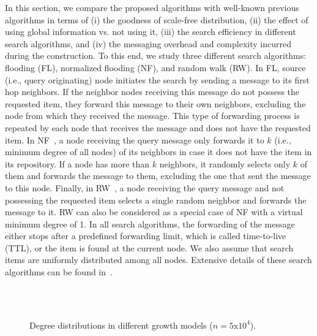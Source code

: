 \documentclass[10pt,journal,cspaper,compsoc]{IEEEtran}
\begin{document}
In this section, we compare the proposed algorithms with well-known previous algorithms in terms of (i) the goodness of scale-free distribution, (ii) the effect of using global information vs. not using it, (iii) the search efficiency in different search algorithms, and  (iv) the messaging overhead and complexity incurred during the construction.  To this end, we study three different search algorithms: flooding (FL), normalized flooding (NF), and random walk (RW). In FL, source (i.e., query originating) node initiates the search by sending a message to its first hop neighbors. If the neighbor nodes receiving this message do not possess the requested item, they forward this message to their own neighbors, excluding the node from which they received the message. This type of forwarding process is repeated by each node that receives the message and does not have the requested item. In NF~\cite{nf}, a node receiving the query message only forwards it to $k$ (i.e., minimum degree of all nodes) of its neighbors in case it does not have the item in its repository. If a node has more than $k$ neighbors, it randomly selects only $k$ of them and forwards the message to them, excluding the one that sent the message to this node. Finally, in RW~\cite{rw}, a node receiving the query message and not possessing the requested item selects a single random neighbor and forwards the message to it. RW can also be considered as a special case of NF with a virtual minimum degree of 1. In all search algorithms, the forwarding of the message either stops after a predefined forwarding limit, which is called time-to-live (TTL), or the item is found at the current node. We also assume that search items are uniformly distributed among all nodes. Extensive details of these search algorithms can be found in~\cite{guclu}.


\begin{figure*}
\begin{center}
\\
\\
\caption{Degree distributions in different growth models ($n = 5$x$10^4$).}
\label{fig:dist}
\end{center}
\end{figure*}
\end{document}
